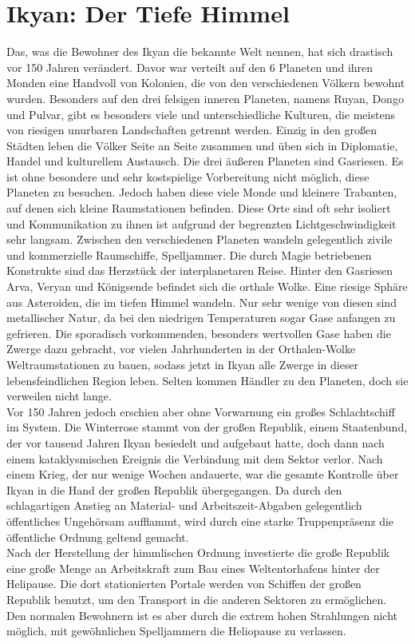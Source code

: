 \documentclass{book}
\begin{document}
\tableofcontents

\chapter{Ikyan: Der Tiefe Himmel}
    Das, was die Bewohner des Ikyan die bekannte Welt nennen, hat sich drastisch vor 150 Jahren verändert. Davor war verteilt auf den 6 Planeten und ihren Monden eine Handvoll von Kolonien, die von den verschiedenen Völkern bewohnt wurden. Besonders auf den drei felsigen inneren Planeten, namens Ruyan, Dongo und Pulvar, gibt es besonders viele und unterschiedliche Kulturen, die meistens von riesigen unurbaren Landschaften getrennt werden. Einzig in den großen Städten leben die Völker Seite an Seite zusammen und üben sich in Diplomatie, Handel und kulturellem Austausch. Die drei äußeren Planeten sind Gasriesen. Es ist ohne besondere und sehr kostspielige Vorbereitung nicht möglich, diese Planeten zu besuchen. Jedoch haben diese viele Monde und kleinere Trabanten, auf denen sich kleine Raumstationen befinden. Diese Orte sind oft sehr isoliert und Kommunikation zu ihnen ist aufgrund der begrenzten Lichtgeschwindigkeit sehr langsam. Zwischen den verschiedenen Planeten wandeln gelegentlich zivile und kommerzielle Raumschiffe, Spelljammer. Die durch Magie betriebenen Konstrukte sind das Herzstück der interplanetaren Reise. Hinter den Gasriesen Arva, Veryan und Königsende befindet sich die orthale Wolke. Eine riesige Sphäre aus Asteroiden, die im tiefen Himmel wandeln. Nur sehr wenige von diesen sind metallischer Natur, da bei den niedrigen Temperaturen sogar Gase anfangen zu gefrieren. Die sporadisch vorkommenden, besonders wertvollen Gase haben die Zwerge dazu gebracht, vor vielen Jahrhunderten in der Orthalen-Wolke Weltraumstationen zu bauen, sodass jetzt in Ikyan alle Zwerge in dieser lebensfeindlichen Region leben. Selten kommen Händler zu den Planeten, doch sie verweilen nicht lange.\\
    Vor 150 Jahren jedoch erschien aber ohne Vorwarnung ein großes Schlachtschiff im System. Die Winterrose stammt von der großen Republik, einem Staatenbund, der vor tausend Jahren Ikyan besiedelt und aufgebaut hatte, doch dann nach einem kataklysmischen Ereignis die Verbindung mit dem Sektor verlor. Nach einem Krieg, der nur wenige Wochen andauerte, war die gesamte Kontrolle über Ikyan in die Hand der großen Republik übergegangen. Da durch den schlagartigen Anstieg an Material- und Arbeitszeit-Abgaben gelegentlich öffentliches Ungehörsam aufflammt, wird durch eine starke Truppenpräsenz die öffentliche Ordnung geltend gemacht.\\
    Nach der Herstellung der himmlischen Ordnung investierte die große Republik eine große Menge an Arbeitskraft zum Bau eines Weltentorhafens hinter der Helipause. Die dort stationierten Portale werden von Schiffen der großen Republik benutzt, um den Transport in die anderen Sektoren zu ermöglichen. Den normalen Bewohnern ist es aber durch die extrem hohen Strahlungen nicht möglich, mit gewöhnlichen Spelljammern die Heliopause zu verlassen.
\end{document}

